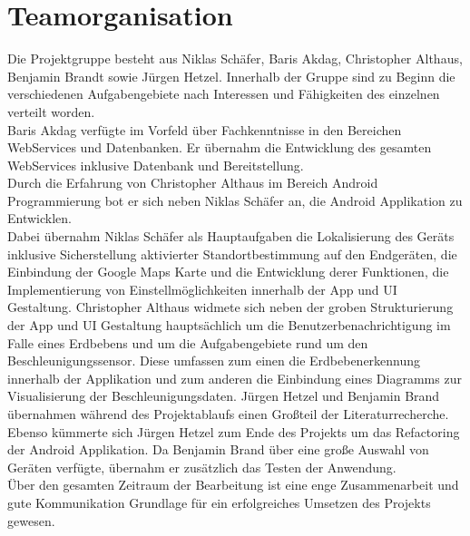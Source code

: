 \section{Teamorganisation}
Die Projektgruppe besteht aus Niklas Schäfer, Baris Akdag, Christopher Althaus, Benjamin Brandt sowie Jürgen Hetzel. Innerhalb der Gruppe sind zu Beginn die verschiedenen Aufgabengebiete nach Interessen und Fähigkeiten des einzelnen verteilt worden.\\
Baris Akdag verfügte im Vorfeld über Fachkenntnisse in den Bereichen WebServices und Datenbanken. Er übernahm die Entwicklung des gesamten WebServices inklusive Datenbank und Bereitstellung.\\
Durch die Erfahrung von Christopher Althaus im Bereich Android Programmierung bot er sich neben Niklas Schäfer an, die Android Applikation zu Entwicklen.\\
Dabei übernahm Niklas Schäfer als Hauptaufgaben die Lokalisierung des Geräts inklusive Sicherstellung aktivierter Standortbestimmung auf den Endgeräten, die Einbindung der Google Maps Karte und die Entwicklung derer Funktionen, die Implementierung von Einstellmöglichkeiten innerhalb der App und UI Gestaltung. Christopher Althaus widmete sich neben der groben Strukturierung der App und UI Gestaltung hauptsächlich um die Benutzerbenachrichtigung im Falle eines Erdbebens und um die Aufgabengebiete rund um den Beschleunigungssensor. Diese umfassen zum einen die Erdbebenerkennung innerhalb der Applikation und zum anderen die Einbindung eines Diagramms zur Visualisierung der Beschleunigungsdaten. Jürgen Hetzel und Benjamin Brand übernahmen während des Projektablaufs einen Großteil der Literaturrecherche. Ebenso kümmerte sich Jürgen Hetzel zum Ende des Projekts um das Refactoring der Android Applikation.
Da Benjamin Brand über eine große Auswahl von Geräten verfügte, übernahm er zusätzlich das Testen der Anwendung.\\
Über den gesamten Zeitraum der Bearbeitung ist eine enge Zusammenarbeit und gute Kommunikation Grundlage für ein erfolgreiches Umsetzen des Projekts gewesen.
\newpage